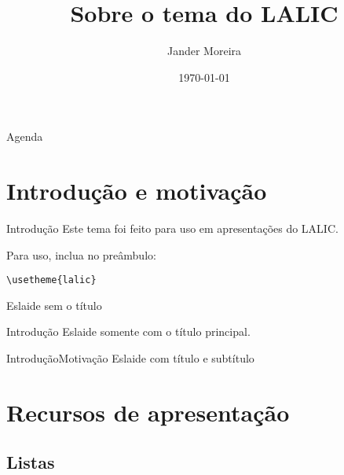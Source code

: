 \documentclass[
brazilian, %
12pt, %
]{beamer}
\title{Sobre o tema do LALIC}
\author{Jander Moreira}
\date{\today} %
\begin{document}
	\begin{frame}
		\titlepage	
	\end{frame}
	
	\begin{frame}{Agenda}
		\tableofcontents
	\end{frame}
	
	
	
	\section{Introdução e motivação}
	\begin{frame}{Introdução}
		Este tema foi feito para uso em apresentações do LALIC.
		
		\vspace{2em}
		Para uso, inclua no preâmbulo:
		
		\centering\texttt{\textbackslash usetheme\{lalic\}}
	\end{frame}
	
	\begin{frame}
		Eslaide sem o título
	\end{frame}
	
	\begin{frame}{Introdução}
		Eslaide somente com o título principal.
	\end{frame}
	
	
	\begin{frame}{Introdução}{Motivação}
		Eslaide com título e subtítulo
	\end{frame}
	
	
	\section[Recursos]{Recursos de apresentação}
	
	\subsection{Listas}
	
\end{document}
